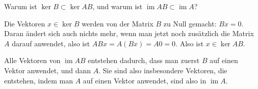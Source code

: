 Warum ist $\operatorname{ker}B \subset \operatorname{ker}AB$, und
warum ist $\operatorname{im}AB\subset\operatorname{im}A$?

\begin{loesung}
Die Vektoren $x\in\operatorname{ker}B$ werden von der Matrix $B$ zu
Null gemacht: $Bx=0$. Daran ändert sich auch nichts mehr, wenn man jetzt
noch zusätzlich die Matrix $A$ darauf anwendet, also ist $ABx=A(Bx)=A0=0$.
Also ist $x\in\operatorname{ker}AB$.

Alle Vektoren von $\operatorname{im}AB$ entstehen dadurch, dass
man zuerst $B$ auf einen Vektor anwendet, und dann $A$. Sie sind
also insbesondere Vektoren, die entstehen, indem man $A$ auf einen
Vektor anwendet, sind also in $\operatorname{im}A$.
\end{loesung}

